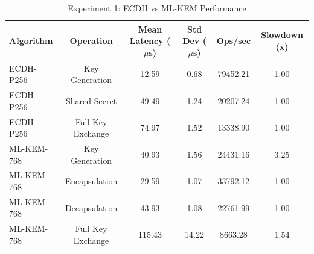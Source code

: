 \begin{table}
\caption{Experiment 1: ECDH vs ML-KEM Performance}
\label{tab:exp1}
\begin{tabular}{lccccc}
\toprule
Algorithm & Operation & Mean Latency ($\mu$s) & Std Dev ($\mu$s) & Ops/sec & Slowdown (x) \\
\midrule
ECDH-P256 & Key Generation & 12.59 & 0.68 & 79452.21 & 1.00 \\
ECDH-P256 & Shared Secret & 49.49 & 1.24 & 20207.24 & 1.00 \\
ECDH-P256 & Full Key Exchange & 74.97 & 1.52 & 13338.90 & 1.00 \\
ML-KEM-768 & Key Generation & 40.93 & 1.56 & 24431.16 & 3.25 \\
ML-KEM-768 & Encapsulation & 29.59 & 1.07 & 33792.12 & 1.00 \\
ML-KEM-768 & Decapsulation & 43.93 & 1.08 & 22761.99 & 1.00 \\
ML-KEM-768 & Full Key Exchange & 115.43 & 14.22 & 8663.28 & 1.54 \\
\bottomrule
\end{tabular}
\end{table}
